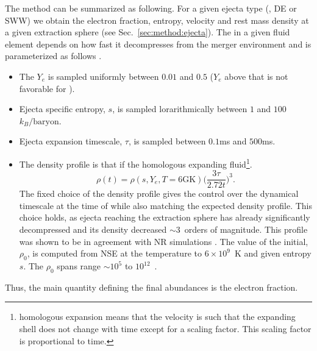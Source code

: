 The method can be summarized as following.
For a given ejecta type (\eg, \ac{DE} or \ac{SWW}) we obtain the electron fraction,
entropy, velocity and rest mass density 
at a given extraction sphere (see Sec.~\ref{sec:method:ejecta}).
%
The \rproc{} in a given fluid element depends on how fast it decompresses from the 
merger environment and is parameterized as follows \cite{Lippuner:2015gwa}.
\begin{itemize}
    \item 
    The $Y_e$ is sampled uniformly between $0.01$ and $0.5$ 
    ($Y_e$ above that is not favorable for \rproc{}).
    \item Ejecta specific entropy, $s$, is sampled lorarithmically 
    between $1$ and $100$ $k_B/\text{baryon}$.
    \item Ejecta expansion timescale, %
    $\tau$, is sampled between $0.1$ms and $500$ms.
    \item The density profile is that if the homologous expanding fluid\footnote{
        homologous expansion means that the velocity is such that the expanding shell 
        does not change with time except for a scaling factor. 
        This scaling factor is proportional to time.
    }.%
    \begin{equation}
    \rho(t) = \rho(s, Y_e, T=6\text{GK})\Big(\frac{3\tau}{2.72 t}\Big)^3.
    \label{eq:nuc:rho_nuccalc}
    \end{equation}
    The fixed choice of the density profile gives the control over the dynamical 
    timescale at the time of \rproc{} while also matching the expected density profile.
    This choice holds, as ejecta reaching the extraction sphere has already 
    significantly decompressed and its density decreased ${\sim}3$~orders of magnitude. 
    This profile was shown to be in agreement with \ac{NR} simulations 
    \citep{Lippuner:2015gwa,Foucart:2014nda}.
    The value of the initial, $\rho_0$,  is computed from \ac{NSE} 
    at the temperature to $6\times10^9$~K and given 
    entropy $s$. The $\rho_0$ spans range $\sim10^5$ to $10^{12}$~\gcm.
\end{itemize}
%
Thus, the main quantity defining the final abundances is the electron fraction.

